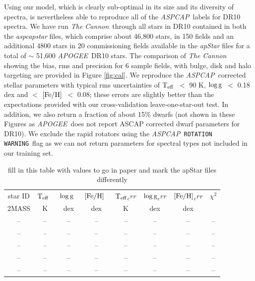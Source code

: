 \documentclass[12pt, preprint]{aastex}
\newcommand{\teff}{\mbox{$\rm T_{eff}$}}
\newcommand{\feh}{\mbox{$\rm [Fe/H]$}}
\newcommand{\logg}{\mbox{$\rm \log g$}}
\newcommand{\tc}{\textsl{The Cannon}}
\newcommand{\apogee}{\textsl{APOGEE}}
\newcommand{\aspcap}{\textsl{ASPCAP}}
\newcommand{\rotwarn}{\texttt{ROTATION WARNING}}
\begin{document}
Using our model, which is clearly sub-optimal in its size and its diversity of spectra, is nevertheless able to reproduce all of the \aspcap\ labels for DR10 spectra. We have run \tc\ through all stars in DR10 contained in both the \textit{aspcapstar} files,  which comprise about 46,800 stars, in 150 fields and an additional 4800 stars in 20 commissioning fields available in the \textit{apStar} files for a total of $\sim$ 51,600 \apogee\ DR10 stars. The comparison of \tc\, showing the bias, rms and precision for 6 sample fields, with bulge, disk and halo targeting are provided in Figure \ref{fig:cal}. We reproduce the \aspcap\ corrected stellar parameters with typical rms uncertainties of \teff\ $<$ 90 K, \logg\ $<$ 0.18 dex and $<$ \feh\ $<$ 0.08; these errors are slightly better than the expectations provided with our cross-validation leave-one-star-out test. In addition, we also return a fraction of about 15\% dwarfs (not shown in these Figures as \apogee\ does not report ASCAP corrected dwarf parameters for DR10). We exclude the rapid rotators using the \aspcap\ \rotwarn\ flag as we can not return parameters for spectral types not included in our training set. 

\begin{table}
\centering
\caption{Excerpt of table of measured stellar parameters from label transfer of \tc\. The full table of 42,000 stars is available online. We include DR10 commissioning fields for which no ASPCAP parameters were available and for these stars, marked with $^1$ we do not exclude on \textit{rotation warning flag set}. The full table is available as Supplementary Material online.}

\begin{tabular}{| c | c | c |  c | c | c |  c | c |}
\hline
star ID & \teff\ & \logg\ & \feh\ & \teff\mbox{$_err$} & \logg\mbox{$_err$} & \feh\mbox{$_err$} & $\chi^2$\\
{2MASS} &  K &  dex  & dex & K & dex & dex & \\    
\hline
-- &    -- &      -- &      -- &    -- &   -- &     -- & -- \\
-- &      -- &    -- &      -- &    -- &   -- &    -- & -- \\
-- &      --&     -- &    -- &    -- &     -- &     --&  -- \\
-- &    -- &      -- &    -- &    -- &   -- &    --&  -- \\
-- &     -- &    --&      -- &    -- &    --&      -- & -- \\
 \hline
\end{tabular}
\caption{fill in this table with values to go in paper and mark the apStar files differently} 
\label{tab:online}
\end{table}  
\end{document}
